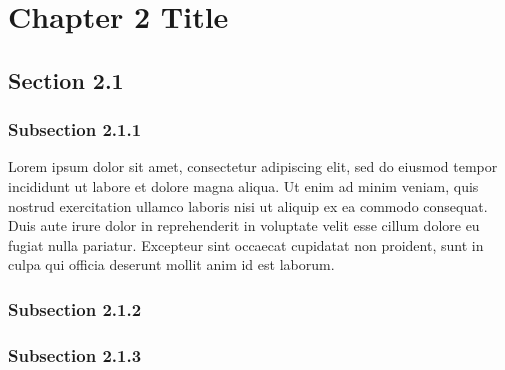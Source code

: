 \chapter{Chapter 2 Title}

\section{Section 2.1}


\subsection{Subsection 2.1.1}

Lorem ipsum dolor sit amet, consectetur adipiscing elit, sed do eiusmod tempor incididunt ut labore et dolore magna aliqua. Ut enim ad minim veniam, quis nostrud exercitation ullamco laboris nisi ut aliquip ex ea commodo consequat. Duis aute irure dolor in reprehenderit in voluptate velit esse cillum dolore eu fugiat nulla pariatur. Excepteur sint occaecat cupidatat non proident, sunt in culpa qui officia deserunt mollit anim id est laborum.


\subsection{Subsection 2.1.2}


\subsection{Subsection 2.1.3}


